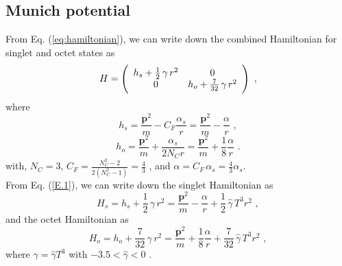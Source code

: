 \documentclass[times,sort&compress,final]{elsarticle}
\begin{document}
\subsection{Munich potential}
\label{sec:munichpotential}
From Eq. (\ref{eq:hamiltonian}), we can write down the combined Hamiltonian \cite{Brambilla:2017zei} for singlet and octet states as 
%
\begin{equation}
  H = \left(\begin{array}{c c}
h_s + \frac{1}{2}\,\gamma\,r^2& 0\\
0 & h_o + \frac{7}{32}\,\gamma\,r^2
\end{array}\right)\,\,,\label{E.1}
\end{equation}
%
where
%
\begin{equation}
    h_s = \frac{\mathbf{p}^2}{m} - C_F \frac{\alpha_s}{r} = \frac{\mathbf{p}^2}{m} - \frac{\alpha}{r}\,\,,
\end{equation}
%
\begin{equation}
  h_o = \frac{\mathbf{p}^2}{m} + \frac{\alpha_s}{2 N_C r}=\frac{\mathbf{p}^2}{m} + \frac{1}{8} \frac{\alpha}{r}\,\,.
\end{equation}
%
with,  $N_C = 3$, $C_F = \frac{N^2_C - 2}{2(N_C^2-1)} = \frac{4}{3}$ , and $\alpha = C_F \,\alpha_s = \frac{4}{3}\alpha_s$.\\

From Eq. (\ref{E.1}), we can write down the singlet Hamiltonian as 
%
\begin{equation}
  H_s = h_s + \frac{1}{2}\,\gamma\,r^2 =\frac{\mathbf{p}^2}{m} -  \frac{\alpha}{r} + \frac{1}{2}\,\hat{\gamma}\,T^3 r^2 \,\,, \label{E.4}
\end{equation}
%
and the octet Hamiltonian as 
%
\begin{equation}
  H_o = h_o + \frac{7}{32}\,\gamma\,r^2 = \frac{\mathbf{p}^2}{m} +  \frac{1}{8}\frac{\alpha}{r} + \frac{7}{32}\,\hat{\gamma}\,T^3 r^2 \,\,,\label{E.5}
\end{equation}
%
where $\gamma = \hat{\gamma}T^3$ with $-3.5 < \hat{\gamma} < 0$ \cite{Brambilla:2019tpt,Brambilla:2020qwo}.
\end{document}
